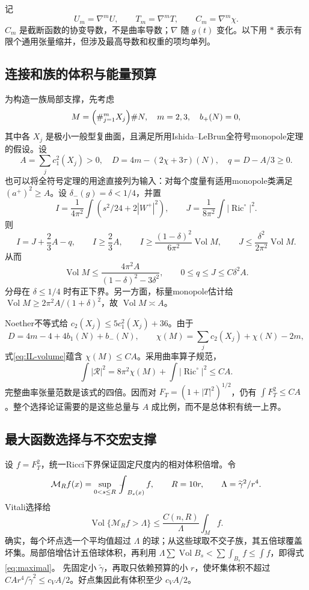\documentclass[UTF8,a4paper,11pt,fontset=fandol]{ctexart}
\numberwithin{equation}{section}
\theoremstyle{definition}
\newcommand{\Ric}{\operatorname{Ric}}
\newcommand{\Vol}{\operatorname{Vol}}
\newcommand{\fint}{\mathop{\rlap{\,\raisebox{0.1ex}{\tiny$-$}}\int}\nolimits}
\begin{document}
记
\[
U_m=\nabla^mU,\qquad T_m=\nabla^mT,\qquad C_m=\nabla^m\chi.
\]
$C_m$ 是截断函数的协变导数，不是曲率导数；$\nabla$ 随 $g(t)$ 变化。以下用 $*$ 表示有限个通用张量缩并，但涉及最高导数和权重的项均单列。

\subsection{连接和族的体积与能量预算}
为构造一族局部支撑，先考虑
\[
M=\Bigl(\#_{j=1}^{m}X_j\Bigr)\#N,\quad m=2,3,\quad b_+(N)=0,
\]
其中各 $X_j$ 是极小一般型复曲面，且满足所用Ishida--LeBrun全符号monopole定理的假设。设
\[
A=\sum_jc_1^2(X_j)>0,\quad
D=4m-(2\chi+3\tau)(N),\quad q=D-A/3\ge0.
\]
也可以将全符号定理的用途直接列为输入：对每个度量有适用monopole类满足 $(a^+)^2\ge A$。设 $\delta_-(g)=\delta<1/4$，并置
\[
I=\frac1{4\pi^2}\int(s^2/24+2|W^+|^2),\qquad
J=\frac1{8\pi^2}\int|\Ric^\circ|^2.
\]
则
\[
I=J+\frac23A-q,\qquad I\ge\frac23A,\qquad
I\ge\frac{(1-\delta)^2}{6\pi^2}\Vol M,\qquad
J\le\frac{\delta^2}{2\pi^2}\Vol M.
\]
从而
\begin{equation}\label{eq:IL-volume}
\Vol M\le\frac{4\pi^2A}{(1-\delta)^2-3\delta^2},
\qquad 0\le q\le J\le C\delta^2A.
\end{equation}
分母在 $\delta\le1/4$ 时有正下界。另一方面，标量monopole估计给 $\Vol M\ge2\pi^2A/(1+\delta)^2$，故 $\Vol M\asymp A$。

Noether不等式给 $c_2(X_j)\le5c_1^2(X_j)+36$。由于
\[
D=4m-4+4b_1(N)+b_-(N),\qquad
\chi(M)=\sum_jc_2(X_j)+\chi(N)-2m,
\]
式\eqref{eq:IL-volume}蕴含 $\chi(M)\le CA$。采用曲率算子规范，
\[
\int|\mathcal R|^2=8\pi^2\chi(M)+\int|\Ric^\circ|^2\le CA.
\]
完整曲率张量范数是该式的四倍。因而对
$F_T=(1+|T|^2)^{1/2}$，仍有 $\int F_T^2\le CA$。整个选择论证需要的是这些总量与 $A$ 成比例，而不是总体积有统一上界。

\subsection{最大函数选择与不交宏支撑}
设 $f=F_T^2$，统一Ricci下界保证固定尺度内的相对体积倍增。令
\[
\mathcal M_Rf(x)=\sup_{0<s\le R}\fint_{B_s(x)}f,\qquad
R=10r,\qquad \Lambda=\widetilde\gamma^2/r^4.
\]
Vitali选择给
\begin{equation}\label{eq:maximal}
\Vol\{\mathcal M_Rf>\Lambda\}\le
\frac{C(n,R)}{\Lambda}\int_Mf.
\end{equation}
确实，每个坏点选一个平均值超过 $\Lambda$ 的球；从这些球取不交子族，其五倍球覆盖坏集。局部倍增估计五倍球体积，再利用
$\Lambda\sum\Vol B_s<\sum\int_{B_s}f\le\int f$，即得式\eqref{eq:maximal}。
先固定小 $\widetilde\gamma$，再取只依赖预算的小 $r$，使坏集体积不超过
$CA r^4/\widetilde\gamma^2\le c_VA/2$。好点集因此有体积至少 $c_VA/2$。
\end{document}
